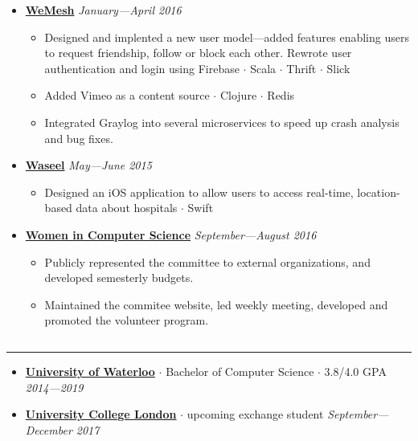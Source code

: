 \documentclass[7pt,letterpaper]{article}
\newcommand{\dt}{$\cdot$ }
\begin{document}
\begin{itemize}
    \item[]
    {\href{http://www.rave.io}{\textbf{WeMesh}} \hfill
      \emph{January---April 2016}}

    \begin{itemize}[label=\textbullet]
      \itemsep0em
      \item Designed and implented a new user model---added features enabling
        users to request friendship, follow or block each other. Rewrote user
        authentication and login using Firebase \dt Scala \dt Thrift \dt Slick
      \item Added Vimeo as a content source \dt Clojure \dt Redis
      \item Integrated Graylog into several microservices to speed up crash
        analysis and bug fixes.
    \end{itemize}

    \item[]
    {\href{https://www.wasseel.com}{\textbf{Waseel}} \hfill
      \emph{May---June 2015}}

    \begin{itemize}[label=\textbullet]
      \itemsep0em
      \item Designed an iOS application to allow users to access real-time,
        location-based data about hospitals \dt Swift
    \end{itemize}
    
    \item[]
    {\href{http://wics.uwaterloo.ca}{\textbf{Women in Computer Science}} \hfill
      \emph{September---August 2016}}

    \begin{itemize}[label=\textbullet]
      \itemsep0em
      \item Publicly represented the committee to external organizations, and
        developed semesterly budgets.
      \item Maintained the commitee website, led weekly meeting, developed and
        promoted the volunteer program.
    \end{itemize}
  \end{itemize}


\subsection*{}
\hrule
\vspace{1.0em}
  \begin{itemize}
    \parskip=-0.5em
  \itemsep0.5em

    \item[]
      {\href{http://www.uwaterloo.ca}{\textbf{University of Waterloo}}} \dt
      Bachelor of Computer Science \dt 3.8/4.0 GPA \hfill \emph{2014---2019}
    \item[]
      {\href{https://www.ucl.ac.uk/}{\textbf{University College London}}} \dt upcoming exchange student
      \hfill \emph{September---December 2017}

  \end{itemize}
\end{document}
